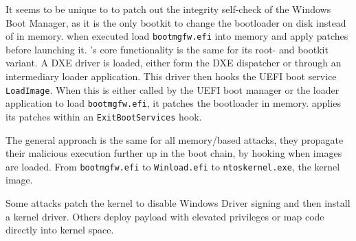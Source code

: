 It seems to be unique to\cite{especter} to patch out the integrity self-check of the Windows Boot Manager, as it is the only bootkit to change the bootloader on disk instead of in memory.
\cite{finspy, dreamboot} when executed load \lstinline{bootmgfw.efi} into memory and apply patches before launching it.
\cite{efiguard}'s core functionality is the same for its root- and bootkit variant.
A \ac{DXE} driver is loaded, either form the \ac{DXE} dispatcher or through an intermediary loader application.
This driver then hooks the \ac{UEFI} boot service \lstinline{LoadImage}. When this is either called by the \ac{UEFI} boot manager or the loader application to load \lstinline{bootmgfw.efi}, it patches the bootloader in memory\cite{efiguard}.\cite{moonbounce} applies its patches within an \lstinline{ExitBootServices} hook.

The general approach is the same for all memory\-/based attacks, they propagate their malicious execution further up in the boot chain, by hooking when images are loaded. From \lstinline{bootmgfw.efi} to \lstinline{Winload.efi} to \lstinline{ntoskernel.exe}, the kernel image.

Some attacks patch the kernel to disable Windows Driver signing and then install a kernel driver\cite{efiguard,especter}.
Others deploy payload with elevated privileges\cite{finspy, dreamboot} or map code directly into kernel space\cite{moonbounce,cosmicstrand}.


